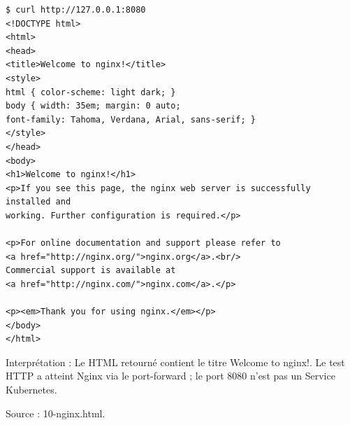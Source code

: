 \documentclass[11pt,a4paper]{article}
\begin{document}
\par\medskip\noindent\begin{minipage}{\linewidth}
\par\vspace{4pt}\noindent\begin{minipage}{\linewidth}
\begin{Verbatim}[breaklines=true,breakanywhere=true,fontsize=\footnotesize,frame=single,framesep=8pt,rulecolor=\color{teal}]
$ curl http://127.0.0.1:8080
<!DOCTYPE html>
<html>
<head>
<title>Welcome to nginx!</title>
<style>
html { color-scheme: light dark; }
body { width: 35em; margin: 0 auto;
font-family: Tahoma, Verdana, Arial, sans-serif; }
</style>
</head>
<body>
<h1>Welcome to nginx!</h1>
<p>If you see this page, the nginx web server is successfully installed and
working. Further configuration is required.</p>

<p>For online documentation and support please refer to
<a href="http://nginx.org/">nginx.org</a>.<br/>
Commercial support is available at
<a href="http://nginx.com/">nginx.com</a>.</p>

<p><em>Thank you for using nginx.</em></p>
</body>
</html>
\end{Verbatim}
\end{minipage}\par\vspace{6pt}

Interprétation : Le HTML retourné contient le titre Welcome to nginx!. Le test HTTP a atteint Nginx via le port-forward ; le port 8080 n'est pas un Service Kubernetes.

{\footnotesize\color{teal} Source : 10-nginx.html.\par}
\end{minipage}\par\medskip
\end{document}
